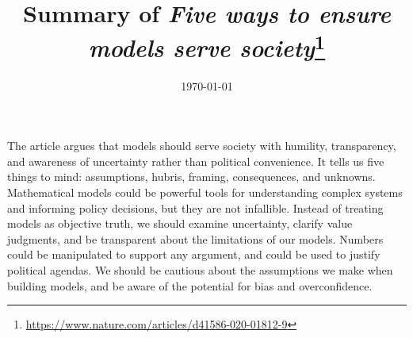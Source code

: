 \documentclass[letterpaper, 11pt]{article}
\title{\vspace{-1.5cm} Summary of \textit{Five ways to ensure models serve society}\footnote{\url{https://www.nature.com/articles/d41586-020-01812-9}}}
\date{\today}
\begin{document}
\hypersetup{colorlinks=true, linkcolor=blue, urlcolor=blue}
\maketitle
The article argues that models should serve society with humility, transparency, and awareness of uncertainty rather than political convenience.
It tells us five things to mind: assumptions, hubris, framing, consequences, and unknowns.
Mathematical models could be powerful tools for understanding complex systems and informing policy decisions, but they are not infallible.
Instead of treating models as objective truth, we should examine uncertainty, clarify value judgments, and be transparent about the limitations of our models.
Numbers could be manipulated to support any argument, and could be used to justify political agendas.
We should be cautious about the assumptions we make when building models, and be aware of the potential for bias and overconfidence.
\end{document}
